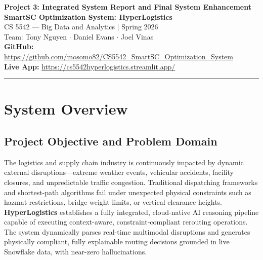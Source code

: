 \documentclass[11pt,letterpaper]{article}
\begin{document}
\begin{center}
{\LARGE \textbf{Project 3: Integrated System Report and Final System Enhancement}} \\[6pt]
{\large \textbf{SmartSC Optimization System: HyperLogistics}} \\[12pt]
{\normalsize CS 5542 --- Big Data and Analytics \hspace{1em}|\hspace{1em} Spring 2026} \\[4pt]
{\normalsize Team: Tony Nguyen $\cdot$ Daniel Evans $\cdot$ Joel Vinas} \\[6pt]
\textbf{GitHub:} \url{https://github.com/mosomo82/CS5542_SmartSC_Optimization_System} \\
\textbf{Live App:} \url{https://cs5542hyperlogistics.streamlit.app/}
\end{center}

\vspace{8pt}
\hrule
\vspace{12pt}

\section{System Overview}

\subsection{Project Objective and Problem Domain}
The logistics and supply chain industry is continuously impacted by dynamic external disruptions---extreme weather events, vehicular accidents, facility closures, and unpredictable traffic congestion. Traditional dispatching frameworks and shortest-path algorithms fail under unexpected physical constraints such as hazmat restrictions, bridge weight limits, or vertical clearance heights. \textbf{HyperLogistics} establishes a fully integrated, cloud-native AI reasoning pipeline capable of executing context-aware, constraint-compliant rerouting operations. The system dynamically parses real-time multimodal disruptions and generates physically compliant, fully explainable routing decisions grounded in live Snowflake data, with near-zero hallucinations.
\end{document}
